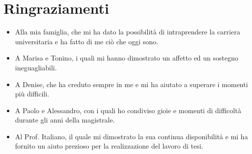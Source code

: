 \chapter*{Ringraziamenti}
\label{chap:ringraziamenti}

\begin{itemize}
\item Alla mia famiglia, che mi ha dato la possibilità di intraprendere la carriera universitaria e ha fatto di me ciò che oggi sono.
\item A Marisa e Tonino, i quali mi hanno dimostrato un affetto ed un sostegno ineguagliabili.
\item A Denise, che ha creduto sempre in me e mi ha aiutato a superare i momenti più difficili.
\item A Paolo e Alessandro, con i quali ho condiviso gioie e momenti di difficoltà durante gli anni della magistrale.
\item Al Prof. Italiano, il quale mi dimostrato la sua continua disponibilità e mi ha fornito un aiuto prezioso per la realizzazione del lavoro di tesi.
\end{itemize}
